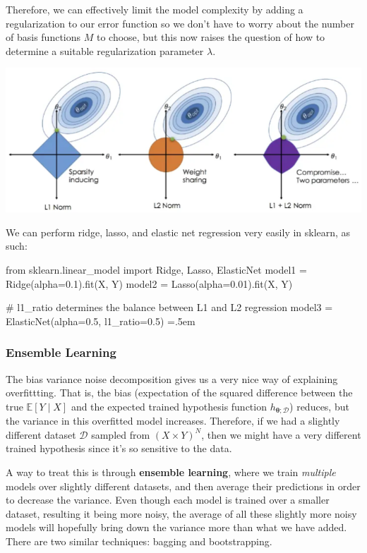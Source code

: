 \documentclass{article}
\theoremstyle{definition}
\newenvironment{cverbatim}
    {\SaveVerbatim{cverb}}
    {\endSaveVerbatim
    \flushleft\fboxrule=0pt\fboxsep=.5em
    \colorbox{cverbbg}{%
      \makebox[\dimexpr\linewidth-2\fboxsep][l]{\BUseVerbatim{cverb}}%
    }
    \endflushleft
  }
\begin{document}
      Therefore, we can effectively limit the model complexity by adding a regularization to our error function so we don't have to worry about the number of basis functions $M$ to choose, but this now raises the question of how to determine a suitable regularization parameter $\lambda$. 

      \begin{center}
        \includegraphics[scale=0.5]{img/regularizers.png}
      \end{center}

      We can perform ridge, lasso, and elastic net regression very easily in sklearn, as such: 

      \begin{cverbatim}
      from sklearn.linear_model import Ridge, Lasso, ElasticNet
      model1 = Ridge(alpha=0.1).fit(X, Y) 
      model2 = Lasso(alpha=0.01).fit(X, Y)

      # l1_ratio determines the balance between L1 and L2 regression
      model3 = ElasticNet(alpha=0.5, l1_ratio=0.5) 
      \end{cverbatim}

    \subsubsection{Ensemble Learning}

    The bias variance noise decomposition gives us a very nice way of explaining overfittting. That is, the bias (expectation of the squared difference between the true $\mathbb{E}[Y \mid X]$ and the expected trained hypothesis function $h_{\boldsymbol{\theta}; \mathcal{D}}$) reduces, but the variance in this overfitted model increases. Therefore, if we had a slightly different dataset $\mathcal{D}$ sampled from $(X \times Y)^N$, then we might have a very different trained hypothesis since it's so sensitive to the data. 

    A way to treat this is through \textbf{ensemble learning}, where we train \textit{multiple} models over slightly different datasets, and then average their predictions in order to decrease the variance. Even though each model is trained over a smaller dataset, resulting it being more noisy, the average of all these slightly more noisy models will hopefully bring down the variance more than what we have added. There are two similar techniques: bagging and bootstrapping. 
\end{document}
